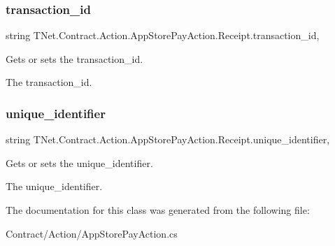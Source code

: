 \subsubsection{\texorpdfstring{transaction\+\_\+id}{transaction\_id}}
{\footnotesize\ttfamily string T\+Net.\+Contract.\+Action.\+App\+Store\+Pay\+Action.\+Receipt.\+transaction\+\_\+id\hspace{0.3cm}{\ttfamily [get]}, {\ttfamily [set]}}



Gets or sets the transaction\+\_\+id. 

The transaction\+\_\+id.\mbox{\label{class_t_net_1_1_contract_1_1_action_1_1_app_store_pay_action_1_1_receipt_ac626fe5260ed127fe224dbf07ea61f14}} 
\subsubsection{\texorpdfstring{unique\+\_\+identifier}{unique\_identifier}}
{\footnotesize\ttfamily string T\+Net.\+Contract.\+Action.\+App\+Store\+Pay\+Action.\+Receipt.\+unique\+\_\+identifier\hspace{0.3cm}{\ttfamily [get]}, {\ttfamily [set]}}



Gets or sets the unique\+\_\+identifier. 

The unique\+\_\+identifier.

The documentation for this class was generated from the following file\+:\begin{DoxyCompactItemize}
\item 
Contract/\+Action/App\+Store\+Pay\+Action.\+cs\end{DoxyCompactItemize}
